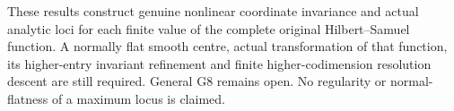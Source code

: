\begin{remark}
These results construct genuine nonlinear coordinate invariance and actual
analytic loci for each finite value of the complete original
Hilbert--Samuel function. A normally flat smooth centre, actual transformation
of that function, its higher-entry invariant refinement and finite
higher-codimension resolution descent are still required. General G8 remains
open. No regularity or normal-flatness of a maximum locus is claimed.
\end{remark}
